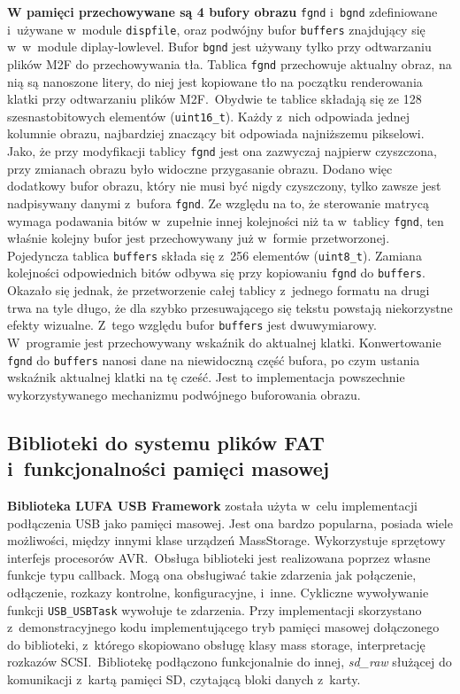 \textbf{W pamięci przechowywane są 4 bufory obrazu} \texttt{fgnd} i~\texttt{bgnd} zdefiniowane i~używane w~module \texttt{dispfile}, oraz podwójny bufor \texttt{buffers} znajdujący się w~w~module diplay-lowlevel. Bufor \texttt{bgnd} jest używany tylko przy odtwarzaniu plików M2F do przechowywania tła. Tablica \texttt{fgnd} przechowuje aktualny obraz, na nią są nanoszone litery, do niej jest kopiowane tło na początku renderowania klatki przy odtwarzaniu plików M2F.~Obydwie te tablice składają się ze 128 szesnastobitowych elementów (\texttt{uint16\_t}). Każdy z~nich odpowiada jednej kolumnie obrazu, najbardziej znaczący bit odpowiada najniższemu pikselowi. Jako, że przy modyfikacji tablicy \texttt{fgnd} jest ona zazwyczaj najpierw czyszczona, przy zmianach obrazu było widoczne przygasanie obrazu. Dodano więc dodatkowy bufor obrazu, który nie musi być nigdy czyszczony, tylko zawsze jest nadpisywany danymi z~bufora \texttt{fgnd}. Ze względu na to, że sterowanie matrycą wymaga podawania bitów w~zupełnie innej kolejności niż ta w~tablicy \texttt{fgnd}, ten właśnie kolejny bufor jest przechowywany już w~formie przetworzonej. Pojedyncza tablica \texttt{buffers} składa się z~256 elementów (\texttt{uint8\_t}). Zamiana kolejności odpowiednich bitów odbywa się przy kopiowaniu \texttt{fgnd} do \texttt{buffers}. Okazało się jednak, że przetworzenie całej tablicy z~jednego formatu na drugi trwa na tyle długo, że dla szybko przesuwającego się tekstu powstają niekorzystne efekty wizualne. Z~tego względu bufor \texttt{buffers} jest dwuwymiarowy. W~programie jest przechowywany wskaźnik do aktualnej klatki. Konwertowanie \texttt{fgnd} do \texttt{buffers} nanosi dane na niewidoczną część bufora, po czym ustania wskaźnik aktualnej klatki na tę cześć. Jest to implementacja powszechnie wykorzystywanego mechanizmu podwójnego buforowania obrazu.

\subsection{Biblioteki do systemu plików FAT i~funkcjonalności pamięci masowej}
\textbf{Biblioteka LUFA USB Framework} została użyta w~celu implementacji podłączenia USB jako pamięci masowej. Jest ona bardzo popularna, posiada wiele możliwości, między innymi klase urządzeń MassStorage. Wykorzystuje sprzętowy interfejs procesorów AVR.~Obsługa biblioteki jest realizowana poprzez własne funkcje typu callback. Mogą ona obsługiwać takie zdarzenia jak połączenie, odłączenie, rozkazy kontrolne, konfiguracyjne, i~inne. Cykliczne wywoływanie funkcji \texttt{USB\_USBTask} wywołuje te zdarzenia. Przy implementacji skorzystano z~demonstracyjnego kodu implementującego tryb pamięci masowej dołączonego do biblioteki, z~którego skopiowano obsługę klasy mass storage, interpretację rozkazów SCSI.~Bibliotekę podłączono funkcjonalnie do innej, \textit{sd\_raw} służącej do komunikacji z~kartą pamięci SD, czytającą bloki danych z~karty.

